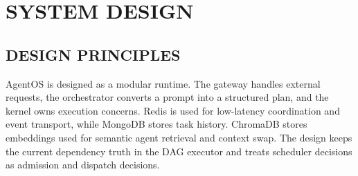 \chapter{\uppercase{System Design}}
\label{ch:chap3}

\section{\uppercase{Design Principles}}
AgentOS is designed as a modular runtime. The gateway handles external requests, the orchestrator converts a prompt into a structured plan, and the kernel owns execution concerns. Redis is used for low-latency coordination and event transport, while MongoDB stores task history. ChromaDB stores embeddings used for semantic agent retrieval and context swap. The design keeps the current dependency truth in the DAG executor and treats scheduler decisions as admission and dispatch decisions.

